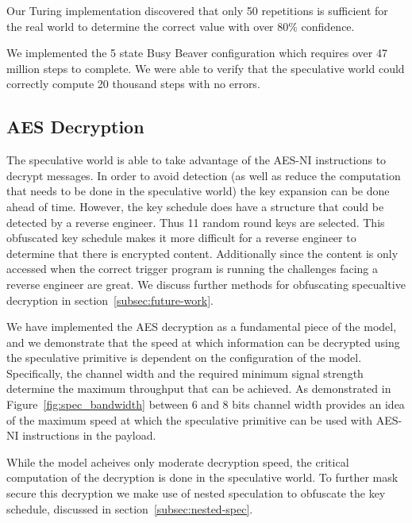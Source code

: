Our Turing implementation discovered that only 50 repetitions is sufficient for
the real world to determine the correct value with over 80\% confidence.

We implemented the 5 state Busy Beaver configuration which requires over 47
million steps to complete. We were able to verify that the speculative world
could correctly compute 20 thousand steps with no errors.



\subsection{AES Decryption}
\label{subsec:impl-aes}
The speculative world is able to take advantage of the AES-NI instructions to
decrypt messages. In order to avoid detection (as well as reduce the computation
that needs to be done in the speculative world) the key expansion can be done
ahead of time. However, the key schedule does have a structure that could be
detected by a reverse engineer. Thus 11 random round keys are selected. This
obfuscated key schedule makes it more difficult for a reverse engineer to
determine that there is encrypted content. Additionally since the content is
only accessed when the correct trigger program is running the challenges facing
a reverse engineer are great. We discuss further methods for obfuscating
specualtive decryption in section~\ref{subsec:future-work}. 


We have implemented the AES decryption as a fundamental piece of the \speculake model,
and we demonstrate that the speed at which information can be decrypted using the speculative 
primitive is dependent on the configuration of the \speculake model. Specifically,
the channel width and the required minimum signal strength determine the maximum
throughput that can be achieved. As demonstrated in Figure~\ref{fig:spec_bandwidth} 
between 6 and 8 bits channel width provides an idea of the maximum speed at which the 
speculative primitive can be used with AES-NI instructions in the payload. 

While the \speculake model acheives only moderate decryption speed, the 
critical computation of the decryption is done in the speculative world. 
To further mask secure this decryption we make use of nested speculation 
to obfuscate the key schedule, discussed in section~\ref{subsec:nested-spec}.

